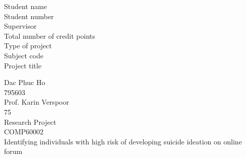 \documentclass[11pt, a4paper, titlepage, oneside, openany]{book}
\begin{document}
	\begin{frontmatter}

		\frontmatterheadings
		
		\begin{minipage}[t]{0.48\textwidth}
   		Student name \\
    		Student number\\
   		Supervisor\\
    		Total number of credit points\\
    		Type of project\\
    		Subject code \\
   		Project title\\
		\end{minipage}
		\begin{minipage}[t]{0.48\textwidth}
		Dac Phuc Ho\\
		795603\\
		Prof. Karin Verspoor\\
		75\\
		 Research Project\\
		COMP60002\\
		Identifying individuals with high risk of developing suicide ideation on online forum\\
		\end{minipage}
		\newpage
		
		\maketitle

		

		\makedeclaration

		



		{%
			\singlespacing%
			\tableofcontents%
			\listoffigures%
			\listoftables%
		   \clearpage%
		}%

   \end{frontmatter}

	\begin{mainmatter}

		\mainmatterheadings

		


		
		
		

	   
		
		

	\end{mainmatter}
\end{document}
